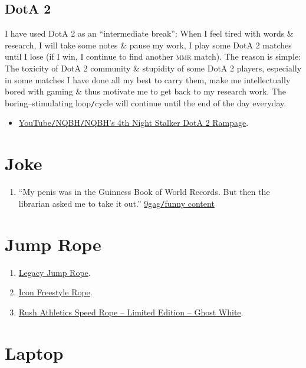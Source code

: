 \documentclass[oneside]{book}
\numberwithin{equation}{section}
\begin{document}
\subsection{DotA 2}
I have used DotA 2 as an ``intermediate break'': When I feel tired with words \& research, I will take some notes \& pause my work, I play some DotA 2 matches until I lose (if I win, I continue to find another \textsc{mmr} match). The reason is simple: The toxicity of DotA 2 community \& stupidity of some DotA 2 players, especially in some matches I have done all my best to carry them, make me intellectually bored with gaming \& thus motivate me to get back to my research work. The boring--stimulating loop\texttt{/}cycle will continue until the end of the day everyday.

\begin{itemize}
	\item \href{https://www.youtube.com/watch?v=d9vmHp-4f3k}{YouTube\texttt{/}NQBH\texttt{/}NQBH's 4th Night Stalker DotA 2 Rampage}.
\end{itemize}

\section{Joke}

\begin{enumerate}
	\item ``My penis was in the Guinness Book of World Records. But then the librarian asked me to take it out.'' \href{https://9gag.com/gag/aPZPm6q}{9gag\texttt{/}funny content}
\end{enumerate}

\section{Jump Rope}

\begin{enumerate}
	\item \href{https://www.rushathletics.co.uk/collections/ropes/products/legacy-jump-rope}{Legacy Jump Rope}.
	\item \href{https://www.rushathletics.co.uk/collections/ropes/products/icon-freestyle-rope}{Icon Freestyle Rope}.
	\item \href{https://www.rushathletics.co.uk/collections/ropes/products/rush-athletics-speed-rope-ghost-white}{Rush Athletics Speed Rope -- Limited Edition -- Ghost White}.
\end{enumerate}

\section{Laptop}
\end{document}
